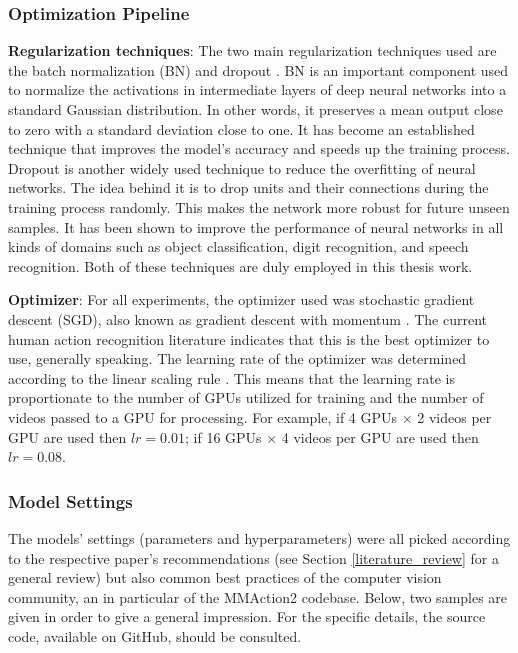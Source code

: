 \documentclass[extern,palatino]{cgMA}
\begin{document}
\subsubsection{Optimization Pipeline}
\textbf{Regularization techniques}: The two main regularization techniques used are the batch normalization (BN) \cite{ioffe2015batch} and dropout \cite{srivastava2014dropout}. BN is an important component used to normalize the activations in intermediate layers of deep neural networks into a standard Gaussian distribution. In other words, it preserves a mean output close to zero with a standard deviation close to one. It has become an established technique that improves the model's accuracy and speeds up the training process. Dropout is another widely used technique to reduce the overfitting of neural networks. The idea behind it is to drop units and their connections during the training process randomly. This makes the network more robust for future unseen samples. It has been shown to improve the performance of neural networks in all kinds of domains such as object classification, digit recognition, and speech recognition. Both of these techniques are duly employed in this thesis work.

\bigskip
\noindent\textbf{Optimizer}: For all experiments, the optimizer used was stochastic gradient descent (SGD), also known as gradient descent with momentum \cite{sutskever2013importance}. The current human action recognition literature indicates that this is the best optimizer to use, generally speaking. The learning rate of the optimizer was determined according to the linear scaling rule \cite{goyal2017accurate}. This means that the learning rate is proportionate to the number of GPUs utilized for training and the number of videos passed to a GPU for processing. For example, if 4 GPUs $\times$ 2 videos per GPU are used then $lr = 0.01$; if 16 GPUs $\times$ 4 videos per GPU are used then $lr = 0.08$.

\subsubsection{Model Settings}
The models' settings (parameters and hyperparameters) were all picked according to the respective paper's recommendations (see Section \ref{literature_review} for a general review) but also common best practices of the computer vision community, an in particular of the MMAction2 codebase. Below, two samples are given in order to give a general impression. For the specific details, the source code, available on GitHub, should be consulted. 
\end{document}
